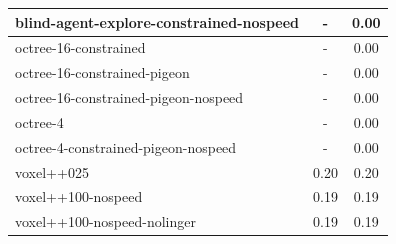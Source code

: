 \begin{longtable}{|l|c|c|}
    blind-agent-explore-constrained-nospeed             & -         & {\cellcolor[HTML]{EBF2F0}} \color[HTML]{000000} 0.00       \\ \hline
    octree-16-constrained                     & -                                                         & {\cellcolor[HTML]{EBF2F0}} \color[HTML]{000000} 0.00        \\ \hline
    octree-16-constrained-pigeon                    & -                                                         & {\cellcolor[HTML]{EBF2F0}} \color[HTML]{000000} 0.00      \\ \hline
    octree-16-constrained-pigeon-nospeed                   & -                                                         & {\cellcolor[HTML]{EBF2F0}} \color[HTML]{000000} 0.00       \\ \hline
    octree-4                  & -                                                         & {\cellcolor[HTML]{EBF2F0}} \color[HTML]{000000} 0.00      \\ \hline
    octree-4-constrained-pigeon-nospeed                  & -                                                         & {\cellcolor[HTML]{EBF2F0}} \color[HTML]{000000} 0.00     \\ \hline
    
    
    voxel++025                              & {\cellcolor[HTML]{D2E6E2}} \color[HTML]{000000} 0.20   & {\cellcolor[HTML]{D2E6E2}} \color[HTML]{000000} 0.20        \\ \hline
    voxel++100-nospeed                      & {\cellcolor[HTML]{D9EAE6}} \color[HTML]{000000} 0.19   & {\cellcolor[HTML]{D9EAE6}} \color[HTML]{000000} 0.19       \\ \hline
    voxel++100-nospeed-nolinger             & {\cellcolor[HTML]{D9EAE6}} \color[HTML]{000000} 0.19   & {\cellcolor[HTML]{D9EAE6}} \color[HTML]{000000} 0.19        \\ \hline
    

\end{longtable}

